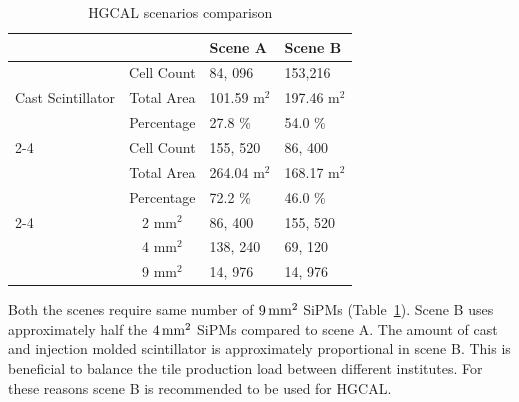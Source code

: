 \begin{table}[!ht]
  \centering
  \caption{\gls{HGCAL} scenarios comparison}\label{tab:scenarios}
  \begin{tabular}{p{1.5in}cll}%
    \toprule
                                                   &                    & Scene A                & Scene B                \\
    \midrule
    \multirow{3}{=}{Cast Scintillator}             & Cell Count         & 84, 096                & 153,216                \\
                                                   & Total Area         & 101.59 \(\text{m}^2 \) & 197.46 \(\text{m}^2 \) \\
                                                   & Percentage         & 27.8 \%                & 54.0 \%                \\
    \cmidrule(lr){2-4}
    \multirow{3}{=}{Injection Molded Scintillator} & Cell Count         & 155, 520               & 86, 400                \\
                                                   & Total Area         & 264.04 \(\text{m}^2 \) & 168.17 \(\text{m}^2 \) \\
                                                   & Percentage         & 72.2 \%                & 46.0 \%                \\
    \cmidrule(lr){2-4}
    \multirow{2}{=}{SiPMs Count}                   & 2 \(\text{mm}^2 \) & 86, 400                & 155, 520               \\
                                                   & 4 \(\text{mm}^2 \) & 138, 240               & 69, 120                \\
                                                   & 9 \(\text{mm}^2 \) & 14, 976                & 14, 976                \\
    \bottomrule
  \end{tabular}
\end{table}


Both the scenes require same number of \(9 \,\text{mm}{}^{2}\) \glspl{SiPM} (Table~\ref{tab:scenarios}).
Scene B uses approximately half the \(4 \,\text{mm}{}^{2}\) \glspl{SiPM}
compared to scene A. The amount of cast and injection molded
scintillator is approximately proportional in scene B. This
is beneficial to balance the tile production load between
different institutes.
For these reasons scene B is recommended to be used for \gls{HGCAL}.